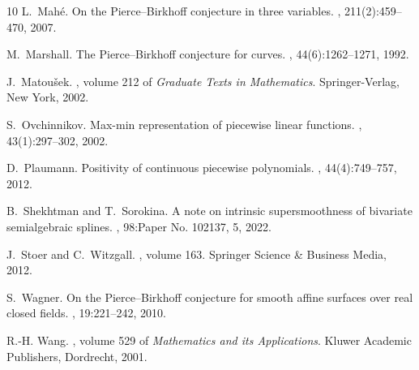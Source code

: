 \documentclass[11pt]{amsart}
\theoremstyle{plain}
\theoremstyle{definition}
\begin{document}
\begin{thebibliography}{10}
L.~Mah\'e.
\newblock On the {P}ierce--{B}irkhoff conjecture in three variables.
, 211(2):459--470, 2007.

M.~Marshall.
\newblock The {P}ierce--{B}irkhoff conjecture for curves.
, 44(6):1262--1271, 1992.

J.~Matou{\v s}ek.
, volume 212 of {\em Graduate
  Texts in Mathematics}.
\newblock Springer-Verlag, New York, 2002.

S.~Ovchinnikov.
\newblock Max-min representation of piecewise linear functions.
, 43(1):297--302, 2002.

D.~Plaumann.
\newblock Positivity of continuous piecewise polynomials.
, 44(4):749--757, 2012.

B.~Shekhtman and T.~Sorokina.
\newblock A note on intrinsic supersmoothness of bivariate semialgebraic
  splines.
, 98:Paper No. 102137, 5, 2022.

J.~Stoer and C.~Witzgall.
, volume 163.
\newblock Springer Science \& Business Media, 2012.

S.~Wagner.
\newblock On the {P}ierce--{B}irkhoff conjecture for smooth affine surfaces
  over real closed fields.
, 19:221--242, 2010.

R.-H. Wang.
, volume
  529 of {\em Mathematics and its Applications}.
\newblock Kluwer Academic Publishers, Dordrecht, 2001.

\end{thebibliography}
\end{document}
